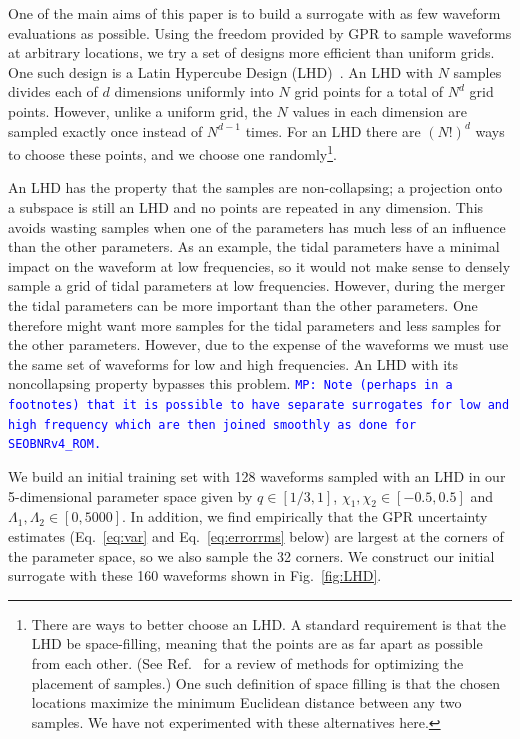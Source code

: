 \documentclass[prd,aps,letter,twocolumn,floatfix,notitlepage,nofootinbib]{revtex4-1}
\newcommand{\MP}[1]{{\textcolor{blue}{\texttt{MP: #1}} }}
\begin{document}
One of the main aims of this paper is to build a surrogate with as few waveform evaluations as possible. Using the freedom provided by GPR to sample waveforms at arbitrary locations, we try a set of designs more efficient than uniform grids. One such design is a Latin Hypercube Design (LHD)~\cite{McKayBeckmanConover1979}. An LHD with $N$ samples divides each of $d$ dimensions uniformly into $N$ grid points for a total of $N^d$ grid points. However, unlike a uniform grid, the $N$ values in each dimension are sampled exactly once instead of $N^{d-1}$ times. For an LHD there are $(N!)^d$ ways to choose these points, and we choose one randomly\footnote{There are ways to better choose an LHD. A standard requirement is that the LHD be space-filling, meaning that the points are as far apart as possible from each other. (See Ref.~\cite{Husslage2011} for a review of methods for optimizing the placement of samples.) One such definition of space filling is that the chosen locations maximize the minimum Euclidean distance between any two samples. We have not experimented with these alternatives here.}. 

An LHD has the property that the samples are non-collapsing; a projection onto a subspace is still an LHD and no points are repeated in any dimension. This avoids wasting samples when one of the parameters has much less of an influence than the other parameters. As an example, the tidal parameters have a minimal impact on the waveform at low frequencies, so it would not make sense to densely sample a grid of tidal parameters at low frequencies. However, during the merger the tidal parameters can be more important than the other parameters. One therefore might want more samples for the tidal parameters and less samples for the other parameters. However, due to the expense of the waveforms we must use the same set of waveforms for low and high frequencies. An LHD with its noncollapsing property bypasses this problem. 
\MP{Note (perhaps in a footnotes) that it is possible to have separate surrogates for low and high frequency which are then joined smoothly as done for \texttt{SEOBNRv4\_ROM}.}

We build an initial training set with 128 waveforms sampled with an LHD in our 5-dimensional parameter space given by $q\in[1/3, 1]$, $\chi_1, \chi_2 \in [-0.5, 0.5]$ and $\Lambda_1, \Lambda_2 \in [0, 5000]$. In addition, we find empirically that the GPR uncertainty estimates (Eq.~\eqref{eq:var} and Eq.~\eqref{eq:errorrms} below) are largest at the corners of the parameter space, so we also sample the 32 corners. We construct our initial surrogate with these 160 waveforms shown in Fig.~\ref{fig:LHD}.
\end{document}
